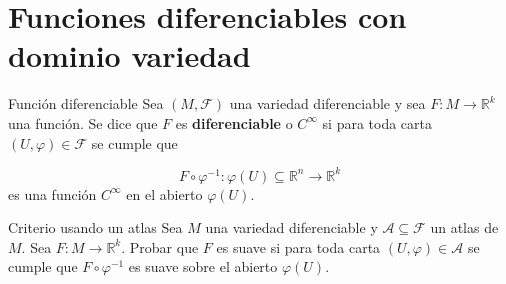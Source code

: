 \section{Funciones diferenciables con dominio variedad}
\begin{bookdefinition}{Función diferenciable}
Sea $(M,\mathcal{F})$ una variedad diferenciable y sea $F:M\to\mathbb{R}^k$ una función. Se dice que $F$ es \textbf{diferenciable} o \textbf{$C^\infty$} si para toda carta $(U,\varphi)\in\mathcal{F}$ se cumple que

\[
F\circ\varphi^{-1}:\varphi(U)\subseteq\mathbb{R}^n\to\mathbb{R}^k
\]
es una función $C^\infty$ en el abierto $\varphi(U)$.

\end{bookdefinition}
\begin{bookexercise}{Criterio usando un atlas}
Sea $M$ una variedad diferenciable y $\mathcal{A}\subseteq\mathcal{F}$ un atlas de $M$. Sea $F:M\to\mathbb{R}^k$. Probar que $F$ es suave si para toda carta $(U,\varphi)\in\mathcal{A}$ se cumple que $F\circ\varphi^{-1}$ es suave sobre el abierto $\varphi(U)$.

\end{bookexercise}
